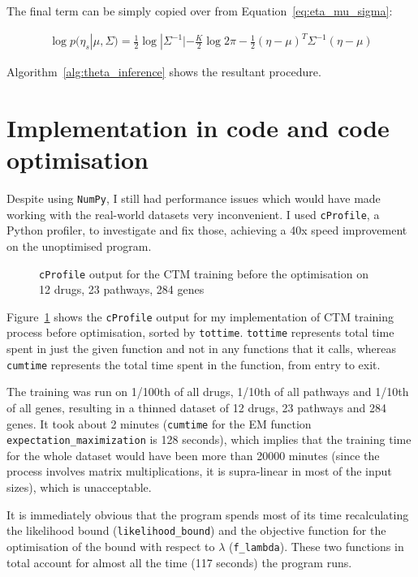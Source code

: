 \documentclass[12pt,a4paper,twoside,openright]{report}
\begin{document}
The final term can be simply copied over from Equation~\ref{eq:eta_mu_sigma}:

\begin{align}
\log p(\eta_s | \mu, \Sigma) = \frac{1}{2} \log |\Sigma^{-1}| - \frac{K}{2} \log 2 \pi - \frac{1}{2}(\eta - \mu)^T\Sigma^{-1}(\eta - \mu)
\end{align}

Algorithm~\ref{alg:theta_inference} shows the resultant procedure.



\section{Implementation in code and code optimisation}

Despite using \texttt{NumPy}, I still had performance issues which would have made working with the real-world datasets very inconvenient. I used \texttt{cProfile}, a Python profiler, to investigate and fix those, achieving a 40x speed improvement on the unoptimised program.

\begin{figure}
\caption{\texttt{cProfile} output for the CTM training before the optimisation on 12 drugs, 23 pathways, 284 genes}
\label{fig:ctm-profile-before}
\end{figure}

Figure~\ref{fig:ctm-profile-before} shows the \texttt{cProfile} output for my implementation of CTM training process before optimisation, sorted by \texttt{tottime}. \texttt{tottime} represents total time spent in just the given function and not in any functions that it calls, whereas \texttt{cumtime} represents the total time spent in the function, from entry to exit.

The training was run on 1/100th of all drugs, 1/10th of all pathways and 1/10th of all genes, resulting in a thinned dataset of 12 drugs, 23 pathways and 284 genes. It took about 2 minutes (\texttt{cumtime} for the EM function \texttt{expectation\_maximization} is 128 seconds), which implies that the training time for the whole dataset would have been more than 20000 minutes (since the process involves matrix multiplications, it is supra-linear in most of the input sizes), which is unacceptable.

It is immediately obvious that the program spends most of its time recalculating the likelihood bound (\texttt{likelihood\_bound}) and the objective function for the optimisation of the bound with respect to $\lambda$ (\texttt{f\_lambda}). These two functions in total account for almost all the time (117 seconds) the program runs.
\end{document}
